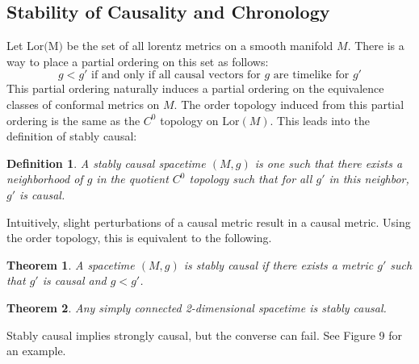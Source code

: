 \documentclass{article}
\theoremstyle{plain}
\newtheorem{theorem}{Theorem}[section]
\theoremstyle{thmit}
\theoremstyle{normal}
\newtheorem{definition}{Definition}[section]
\begin{document}
        \subsection{Stability of Causality and Chronology}
            Let $\textrm{Lor(M)}$ be the set of all lorentz metrics on a smooth
            manifold $M$. There is a way to place a partial ordering on this set
            as follows:
            \begin{equation}
                g<g'\textrm{ if and only if all causal vectors for }g
                \textrm{ are timelike for }g'
            \end{equation}
            This partial ordering naturally induces a partial ordering on the
            equivalence classes of conformal metrics on $M$. The order topology
            induced from this partial ordering is the same as the
            $C^{0}$ topology on $\textrm{Lor}(M)$. This leads into the
            definition of stably causal:
            \begin{definition}
                A stably causal spacetime $(M,g)$ is one such that there exists
                a neighborhood of $g$ in the quotient $C^{0}$ topology such that
                for all $g'$ in this neighbor, $g'$ is causal.
            \end{definition}
            Intuitively, slight perturbations of a causal metric result in a
            causal metric. Using the order topology, this is equivalent to the
            following.
            \begin{theorem}
                A spacetime $(M,g)$ is stably causal if there exists a metric
                $g'$ such that $g'$ is causal and $g<g'$.
            \end{theorem}
            \begin{theorem}
                Any simply connected 2-dimensional spacetime is stably causal.
            \end{theorem}
            Stably causal implies strongly causal, but the converse can fail.
            See Figure 9 for an example.
\end{document}
